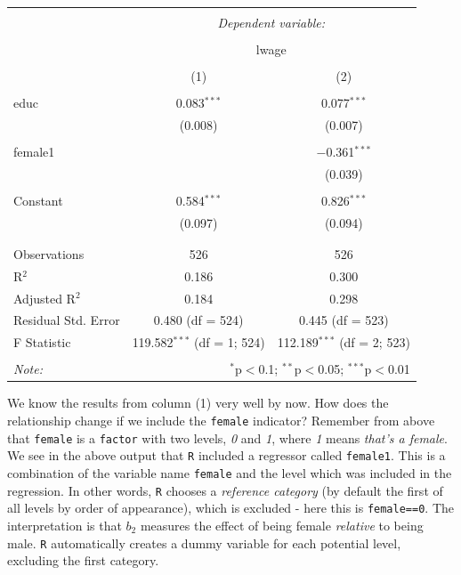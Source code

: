 \documentclass[]{book}
\begin{document}
\begin{table}[!htbp] \centering 
  \caption{} 
  \label{} 
\begin{tabular}{@{\extracolsep{5pt}}lcc} 
\\[-1.8ex]\hline 
\hline \\[-1.8ex] 
 & \multicolumn{2}{c}{\textit{Dependent variable:}} \\ 
\cline{2-3} 
\\[-1.8ex] & \multicolumn{2}{c}{lwage} \\ 
\\[-1.8ex] & (1) & (2)\\ 
\hline \\[-1.8ex] 
 educ & 0.083$^{***}$ & 0.077$^{***}$ \\ 
  & (0.008) & (0.007) \\ 
  & & \\ 
 female1 &  & $-$0.361$^{***}$ \\ 
  &  & (0.039) \\ 
  & & \\ 
 Constant & 0.584$^{***}$ & 0.826$^{***}$ \\ 
  & (0.097) & (0.094) \\ 
  & & \\ 
\hline \\[-1.8ex] 
Observations & 526 & 526 \\ 
R$^{2}$ & 0.186 & 0.300 \\ 
Adjusted R$^{2}$ & 0.184 & 0.298 \\ 
Residual Std. Error & 0.480 (df = 524) & 0.445 (df = 523) \\ 
F Statistic & 119.582$^{***}$ (df = 1; 524) & 112.189$^{***}$ (df = 2; 523) \\ 
\hline 
\hline \\[-1.8ex] 
\textit{Note:}  & \multicolumn{2}{r}{$^{*}$p$<$0.1; $^{**}$p$<$0.05; $^{***}$p$<$0.01} \\ 
\end{tabular} 
\end{table}

We know the results from column (1) very well by now. How does the
relationship change if we include the \texttt{female} indicator?
Remember from above that \texttt{female} is a \texttt{factor} with two
levels, \emph{0} and \emph{1}, where \emph{1} means \emph{that's a
female}. We see in the above output that \texttt{R} included a regressor
called \texttt{female1}. This is a combination of the variable name
\texttt{female} and the level which was included in the regression. In
other words, \texttt{R} chooses a \emph{reference category} (by default
the first of all levels by order of appearance), which is excluded -
here this is \texttt{female==0}. The interpretation is that \(b_2\)
measures the effect of being female \emph{relative} to being male.
\texttt{R} automatically creates a dummy variable for each potential
level, excluding the first category.
\end{document}
